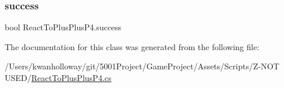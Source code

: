 \subsubsection{\texorpdfstring{success}{success}}
{\footnotesize\ttfamily bool React\+To\+Plus\+Plus\+P4.\+success}



The documentation for this class was generated from the following file\+:\begin{DoxyCompactItemize}
\item 
/\+Users/kwanholloway/git/5001\+Project/\+Game\+Project/\+Assets/\+Scripts/\+Z-\/\+N\+O\+T U\+S\+E\+D/\hyperlink{_react_to_plus_plus_p4_8cs}{React\+To\+Plus\+Plus\+P4.\+cs}\end{DoxyCompactItemize}
